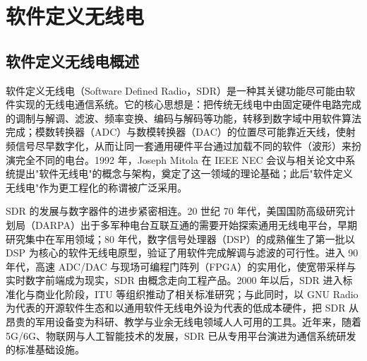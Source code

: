 
\chapter{软件定义无线电}
\label{chap:sdr}

\section{软件定义无线电概述}
\label{sec:sdr_intro}

软件定义无线电（Software Defined Radio，SDR）是一种其关键功能尽可能由软件实现的无线电通信系统。它的核心思想是：把传统无线电中由固定硬件电路完成的调制与解调、滤波、频率变换、编码与解码等功能，转移到数字域中用软件算法完成；模数转换器（ADC）与数模转换器（DAC）的位置尽可能靠近天线，使射频信号尽早数字化，从而让同一套通用硬件平台通过加载不同的软件（波形）来扮演完全不同的电台。1992 年，Joseph Mitola 在 IEEE NEC 会议与相关论文中系统提出"软件无线电"的概念与架构，奠定了这一领域的理论基础；此后"软件定义无线电"作为更工程化的称谓被广泛采用。

SDR 的发展与数字器件的进步紧密相连。20 世纪 70 年代，美国国防高级研究计划局（DARPA）出于多军种电台互联互通的需要开始探索通用无线电平台，早期研究集中在军用领域；80 年代，数字信号处理器（DSP）的成熟催生了第一批以 DSP 为核心的软件无线电原型，验证了用软件完成解调与滤波的可行性。进入 90 年代，高速 ADC/DAC 与现场可编程门阵列（FPGA）的实用化，使宽带采样与实时数字前端成为现实，SDR 由概念走向工程产品。2000 年以后，SDR 进入标准化与商业化阶段，ITU 等组织推动了相关标准研究；与此同时，以 GNU Radio 为代表的开源软件生态和以通用软件无线电外设为代表的低成本硬件，把 SDR 从昂贵的军用设备变为科研、教学与业余无线电领域人人可用的工具。近年来，随着 5G/6G、物联网与人工智能技术的发展，SDR 已从专用平台演进为通信系统研发的标准基础设施。

